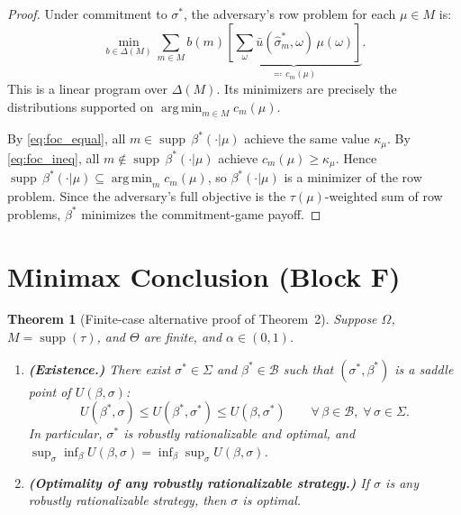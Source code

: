 \documentclass[12pt]{article}
\newtheorem{theorem}{Theorem}
\newcommand{\supp}{\operatorname{supp}}
\newcommand{\argmin}{\operatorname{arg\,min}}
\begin{document}
\begin{proof}
Under commitment to $\sigma^*$, the adversary's row problem for each $\mu \in M$ is:
\[
\min_{b \in \Delta(M)} \sum_{m \in M} b(m) \underbrace{\left[\sum_\omega \bar{u}(\hat\sigma^*_m, \omega)\,\mu(\omega)\right]}_{\eqqcolon\, c_m(\mu)}.
\]
This is a linear program over $\Delta(M)$. Its minimizers are precisely the distributions supported on $\argmin_{m \in M} c_m(\mu)$.

By \eqref{eq:foc_equal}, all $m \in \supp\,\beta^*(\cdot|\mu)$ achieve the same value $\kappa_\mu$. By \eqref{eq:foc_ineq}, all $m \notin \supp\,\beta^*(\cdot|\mu)$ achieve $c_m(\mu) \geq \kappa_\mu$. Hence $\supp\,\beta^*(\cdot|\mu) \subseteq \argmin_{m} c_m(\mu)$, so $\beta^*(\cdot|\mu)$ is a minimizer of the row problem. Since the adversary's full objective is the $\tau(\mu)$-weighted sum of row problems, $\beta^*$ minimizes the commitment-game payoff.
\end{proof}

\section{Minimax Conclusion (Block F)}
\label{sec:minimax}

\begin{theorem}[Finite-case alternative proof of Theorem~2]
\label{thm:main}
Suppose $\Omega$, $M = \supp(\tau)$, and $\Theta$ are finite, and $\alpha \in (0,1)$.
\begin{enumerate}[label=(\alph*)]
\item \textbf{(Existence.)} There exist $\sigma^* \in \Sigma$ and $\beta^* \in \mathcal{B}$ such that $(\sigma^*, \beta^*)$ is a saddle point of $U(\beta, \sigma)$:
\[
U(\beta^*, \sigma) \leq U(\beta^*, \sigma^*) \leq U(\beta, \sigma^*) \qquad \forall\, \beta \in \mathcal{B},\; \forall\, \sigma \in \Sigma.
\]
In particular, $\sigma^*$ is robustly rationalizable and optimal, and $\sup_\sigma \inf_\beta U(\beta, \sigma) = \inf_\beta \sup_\sigma U(\beta, \sigma)$.
\item \textbf{(Optimality of any robustly rationalizable strategy.)} If $\sigma$ is any robustly rationalizable strategy, then $\sigma$ is optimal.
\end{enumerate}
\end{theorem}
\end{document}
